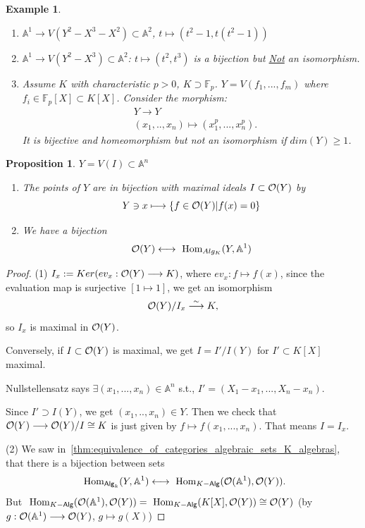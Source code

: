 \documentclass[11pt]{article}
\newtheorem{prop}[thm]{Proposition}
\newtheorem{ex}[thm]{Example}
\renewcommand{\hom}{\text{ Hom}}
\newcommand{\affn}{\mathbb A}
\newcommand{\calo}{{\cal O}}
\newcommand{\lrta}{\longrightarrow}
\newcommand{\llrta}{\longleftrightarrow}
\begin{document}
\begin{ex}\ 
\begin{enumerate}[label=(\arabic*)]
\item $\affn^1\lrta V(Y^2-X^3-X^2)\subset \affn^2$, $t\mapsto (t^2-1,t(t^2-1))$
\item $\affn^1\lrta V(Y^2-X^3)\subset \affn^2$: $t\longmapsto (t^2,t^3)$ is a bijection but \underline{Not} an isomorphism.
\item Assume $K$ with characteristic $p>0$, $K\supset \mathbb{F}_p$. $Y=V(f_1,...,f_m)$ where $f_i\in \mathbb{F}_p[X]\subset K[X]$. Consider the morphism:
$$
\begin{aligned}
&Y\lrta Y\\
& (x_1,..,x_n)\longmapsto (x_1^p,...,x_n^p).
\end{aligned}
$$
It is bijective and homeomorphism but not an isomorphism if $dim(Y)\geq 1$.
\end{enumerate}
\end{ex}
\begin{prop}
$Y=V(I)\subset \affn^n$
\begin{enumerate}[label=(\arabic*)]
\item The points of $Y$ are in bijection with maximal ideals $I\subset \calo(Y)$ by 
$$
Y\ni x\longmapsto \{f\in \calo(Y)|f(x)=0\}
$$
\item We have a bijection 
$$
\calo(Y)\llrta \hom_{Alg_K}(Y,\affn^1)
$$
\end{enumerate}
\end{prop}
\begin{proof}
(1) $I_x:=Ker(ev_x:\calo(Y)\lrta K)$, where $ev_x:f\mapsto f(x)$, since the evaluation map is surjective $[1\mapsto 1]$, we get an isomorphism 
$$
\calo(Y)/I_x\overset{\sim}{\lrta} K,
$$
so $I_x$ is maximal in $\calo(Y)$.

Conversely, if $I\subset \calo(Y)$ is maximal, we get $I=I'/I(Y)$ for $I'\subset K[X]$ maximal. 

Nullstellensatz says $\exists (x_1,...,x_n)\in\affn^n$ s.t., $I'=(X_1-x_1,...,X_n-x_n)$. 

Since $I'\supset I(Y)$, we get $(x_1,..,x_n)\in Y$. Then we check that $\calo(Y)\lrta\calo(Y)/I\cong K$ is just given by $f\mapsto f(x_1,...,x_n)$. That means $I=I_x$.

(2) We saw in~\ref{thm:equivalence_of_categories_algebraic_sets_K_algebras}, that there is a bijection between sets
$$
\hom_{\mathsf{Alg}_k}(Y,\affn^1)\llrta \hom_{K-\mathsf{Alg}}(\calo(\affn^1),\calo(Y)).
$$
But $\hom_{K-\mathsf{Alg}}(\calo(\affn^1),\calo(Y))=\hom_{K-\mathsf{Alg}}(K[X],\calo(Y))\cong \calo(Y)$ (by $g:\calo(\affn^1)\lrta \calo(Y)$, $g\mapsto g(X)$)
\end{proof}
\end{document}
